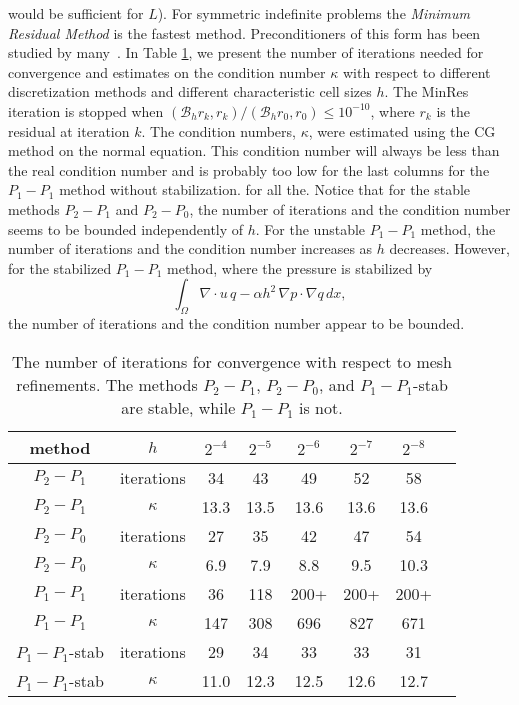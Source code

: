would be sufficient for $L$).
For symmetric  indefinite problems the \emph{Minimum Residual Method} is
the fastest method. Preconditioners of this form has been studied by
many~\cite{E-S-W-text,R-W-92,S-W-93,S-W-94}. In Table \ref{stokes:ex}, 
we present the number of iterations needed for convergence 
and estimates on the condition number $\kappa$ with 
respect to different discretization methods and different characteristic cell sizes $h$. 
The MinRes iteration is stopped when 
$(\mathcal{B}_h r_k, r_k)/(\mathcal{B}_h r_0, r_0) \le 10^{-10}$, where $r_k$ is the residual at
iteration $k$. 
The condition numbers, $\kappa$, were estimated using the CG method on the
normal equation. This condition number will always be less 
than the real condition number and is probably too low
for the last columns for the $P_1-P_1$ method without stabilization. 
for all the. 
Notice that for the stable methods $P_2-P_1$ and $P_2-P_0$,
the number of iterations and the condition number seems to be bounded
independently of $h$. For the unstable $P_1-P_1$ method, the number of iterations
and the condition number increases as $h$ decreases. However, for 
the stabilized $P_1-P_1$ method, where the pressure is stabilized by 
\[
\int_\Omega \nabla \cdot u \, q  - \alpha h^2 \, \nabla p \cdot \nabla q \, dx,       
\]
the number of iterations and the condition number appear to be bounded. 

\begin{table}
\begin{center}
\begin{tabular}{|c|c||c|c|c|c|c|c|}
\hline
method & $h$ & $2^{-4}$ & $2^{-5}$ & $2^{-6}$ & $2^{-7}$ & $2^{-8}$ \\ \hline\hline
$P_2-P_1$ &  iterations & 34 & 43 & 49 & 52 & 58 \\ \hline 
$P_2-P_1$ & $\kappa $ & 13.3 & 13.5 & 13.6 & 13.6 & 13.6 \\ \hline 
$P_2-P_0$ &  iterations & 27 & 35 & 42 & 47 & 54 \\ \hline 
$P_2-P_0$ & $\kappa $ & 6.9 & 7.9 & 8.8 & 9.5 & 10.3 \\ \hline 
$P_1-P_1$ & iterations & 36 & 118 & 200+ & 200+ & 200+ \\ \hline 
$P_1-P_1$ & $\kappa$ & 147 & 308 & 696 & 827 & 671 \\ \hline 
$P_1-P_1$-stab& iterations & 29 & 34 & 33 & 33 & 31 \\ \hline 
$P_1-P_1$-stab& $\kappa $ & 11.0 & 12.3 & 12.5 & 12.6 & 12.7 \\ \hline 
\end{tabular}
\caption{The number of iterations for 
  convergence with respect to mesh refinements.
  The methods $P_2-P_1$, $P_2-P_0$, and $P_1-P_1$-stab are stable, while $P_1-P_1$ is not.}\label{stokes:ex} 
\end{center}
\end{table}

